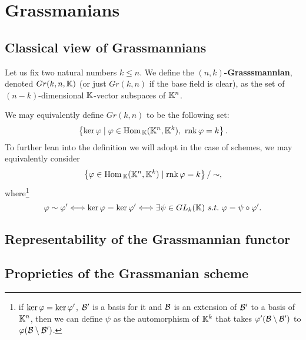 \chapter{Grassmanians}

\section{Classical view of Grassmannians}
\begin{definition}[Grassmannian]
Let us fix two natural numbers $k\leq n$. We define the \textbf{$(n,k)$-Grasssmannian}, denoted $Gr(k,n,\mathbb{K})$ (or just $Gr(k,n)$ if the base field is clear), as the set of $(n-k)$-dimensional $\mathbb{K}$-vector subspaces of $\mathbb{K}^n$.
\end{definition}
\begin{remark}
We may equivalently define $Gr(k,n)$ to be the following set:
\[\left\{{\ker \varphi\mid \varphi\in \mathrm{Hom}\,_{\mathbb{K}}(\mathbb{K}^n,\mathbb{K}^k),\ \mathrm{rnk}\, \varphi=k}\right\}.\]
To further lean into the definition we will adopt in the case of schemes, we may equivalently consider
\[\left\{{\varphi\in \mathrm{Hom}\,_{\mathbb{K}}(\mathbb{K}^n,\mathbb{K}^k)\mid \mathrm{rnk}\, \varphi=k}\right\}/\sim,\]
where\footnote{if $\ker\varphi=\ker \varphi'$, $\mathcal{B}'$ is a basis for it and $\mathcal{B}$ is an extension of $\mathcal{B}'$ to a basis of $\mathbb{K}^n$, then we can define $\psi$ as the automorphism of $\mathbb{K}^k$ that takes $\varphi'(\mathcal{B}\setminus \mathcal{B}')$ to $\varphi(\mathcal{B}\setminus \mathcal{B}')$.}
\[\varphi\sim \varphi'\Longleftrightarrow \ker \varphi=\ker \varphi'\Longleftrightarrow \exists \psi\in GL_k(\mathbb{K})\ s.t.\ \varphi=\psi\circ \varphi'.\]
\end{remark}


\section{Representability of the Grassmannian functor}

\section{Proprieties of the Grassmanian scheme}
